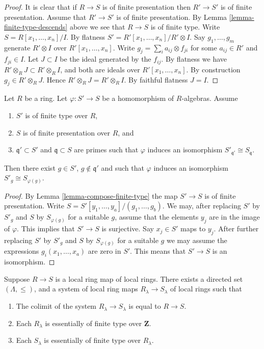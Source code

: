\begin{proof}
It is clear that if $R \to S$ is of finite presentation then $R' \to S'$
is of finite presentation. Assume that $R' \to S'$ is of finite presentation.
By Lemma \ref{lemma-finite-type-descends} above we see
that $R \to S$ is of finite type. Write $S = R[x_1, \ldots, x_n]/I$.
By flatness $S' = R'[x_1, \ldots, x_n]/R'\otimes I$.
Say $g_1, \ldots, g_m$ generate $R'\otimes I$ over $R'[x_1, \ldots, x_n]$.
Write $g_j = \sum_i a_{ij} \otimes f_{ji}$ for some
$a_{ij} \in R'$ and $f_{ji} \in I$. Let $J \subset I$
be the ideal generated by the $f_{ij}$.
By flatness we have $R' \otimes_R J \subset R'\otimes_R I$, and
both are ideals over $R'[x_1, \ldots, x_n]$.
By construction $g_j \in R' \otimes_R J$. Hence
$R' \otimes_R J = R'\otimes_R I$.
By faithful flatness $J = I$.
\end{proof}


\begin{lemma}
\label{lemma-local-isomorphism}
Let $R$ be a ring. Let $\varphi : S' \to S$ be a homomorphism of
$R$-algebras. Assume
\begin{enumerate}
\item $S'$ is of finite type over $R$,
\item $S$ is of finite presentation over $R$, and
\item $\mathfrak q' \subset S'$ and $\mathfrak q \subset S$
are primes such that $\varphi$ induces an
isomorphism $S'_{\mathfrak q'} \cong S_{\mathfrak q}$.
\end{enumerate}
Then there exist $g \in S'$, $g \not \in \mathfrak q'$ and
such that $\varphi$ induces an isomorphism
$S'_{g} \cong S_{\varphi(g)}$.
\end{lemma}

\begin{proof}
By Lemma \ref{lemma-compose-finite-type}
the map $S' \to S$ is of finite presentation.
Write $S = S'[y_1, \ldots, y_a]/(g_1, \ldots, g_b)$.
We may, after replacing $S'$ by $S'_{g}$ and $S$ by $S_{\varphi(g)}$
for a suitable $g$, assume that the elements $y_j$ are in the
image of $\varphi$. This implies that $S' \to S$ is surjective.
Say $x_j \in S'$ maps to $y_j$. After further replacing
$S'$ by $S'_{g}$ and $S$ by $S_{\varphi(g)}$
for a suitable $g$ we may assume the expressions
$g_i(x_1, \ldots, x_a)$ are zero in $S'$.
This means that $S' \to S$ is an isomorphism.
\end{proof}



\begin{lemma}
\label{lemma-limit-no-condition-local}
Suppose $R \to S$ is a local ring map of local rings.
There exists a directed set $(\Lambda, \leq)$, and
a system of local ring maps $R_\lambda \to S_\lambda$
of local rings such that
\begin{enumerate}
\item The colimit of the system $R_\lambda \to S_\lambda$
is equal to $R \to S$.
\item Each $R_\lambda$ is essentially of finite type
over $\mathbf{Z}$.
\item Each $S_\lambda$ is essentially of finite type
over $R_\lambda$.
\end{enumerate}
\end{lemma}

